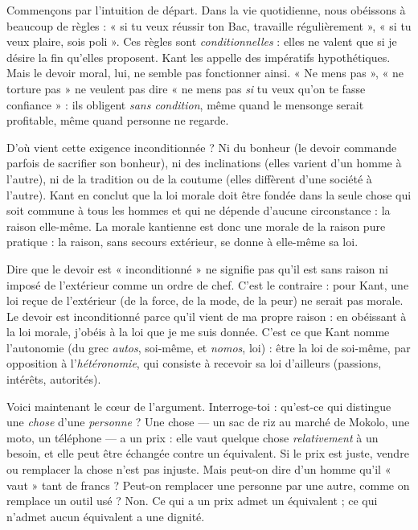 \documentclass[11pt]{article}
\newcommand{\cle}[1]{{\popxbold\color{popdark}#1}}
\newcounter{popsec}
\newcounter{popsub}
\newcommand{\courssub}[1]{%
  \stepcounter{popsub}%
  \par\vspace{9pt}\noindent{\popxbold\fontsize{11.5}{13}\selectfont\color{popink}{\color{poporange}\thepopsec.\thepopsub}\hspace{6pt}#1}\par\nopagebreak\vspace{4pt}
}
\begin{document}
Commençons par l'intuition de départ. Dans la vie quotidienne, nous obéissons à beaucoup de règles : « si tu veux réussir ton Bac, travaille régulièrement », « si tu veux plaire, sois poli ». Ces règles sont \emph{conditionnelles} : elles ne valent que si je désire la fin qu'elles proposent. Kant les appelle des \cle{impératifs hypothétiques}. Mais le devoir moral, lui, ne semble pas fonctionner ainsi. « Ne mens pas », « ne torture pas » ne veulent pas dire « ne mens pas \emph{si} tu veux qu'on te fasse confiance » : ils obligent \emph{sans condition}, même quand le mensonge serait profitable, même quand personne ne regarde.

D'où vient cette exigence inconditionnée ? Ni du bonheur (le devoir commande parfois de sacrifier son bonheur), ni des inclinations (elles varient d'un homme à l'autre), ni de la tradition ou de la coutume (elles diffèrent d'une société à l'autre). Kant en conclut que la loi morale doit être fondée dans la seule chose qui soit commune à tous les hommes et qui ne dépende d'aucune circonstance : la \cle{raison} elle-même. La morale kantienne est donc une morale de la \cle{raison pure pratique} : la raison, sans secours extérieur, se donne à elle-même sa loi.

\begin{attention}
Dire que le devoir est « inconditionné » ne signifie pas qu'il est sans raison ni imposé de l'extérieur comme un ordre de chef. C'est le contraire : pour Kant, une loi reçue de l'extérieur (de la force, de la mode, de la peur) ne serait pas morale. Le devoir est inconditionné parce qu'il vient de ma propre raison : en obéissant à la loi morale, j'obéis à la loi que je me suis donnée. C'est ce que Kant nomme l'\cle{autonomie} (du grec \emph{autos}, soi-même, et \emph{nomos}, loi) : être la loi de soi-même, par opposition à l'\emph{hétéronomie}, qui consiste à recevoir sa loi d'ailleurs (passions, intérêts, autorités).
\end{attention}

\courssub{Prix et dignité : la distinction fondamentale}

Voici maintenant le cœur de l'argument. Interroge-toi : qu'est-ce qui distingue une \emph{chose} d'une \emph{personne} ? Une chose — un sac de riz au marché de Mokolo, une moto, un téléphone — a un \cle{prix} : elle vaut quelque chose \emph{relativement} à un besoin, et elle peut être échangée contre un équivalent. Si le prix est juste, vendre ou remplacer la chose n'est pas injuste. Mais peut-on dire d'un homme qu'il « vaut » tant de francs ? Peut-on remplacer une personne par une autre, comme on remplace un outil usé ? Non. Ce qui a un prix admet un équivalent ; ce qui n'admet aucun équivalent a une \cle{dignité}.
\end{document}
